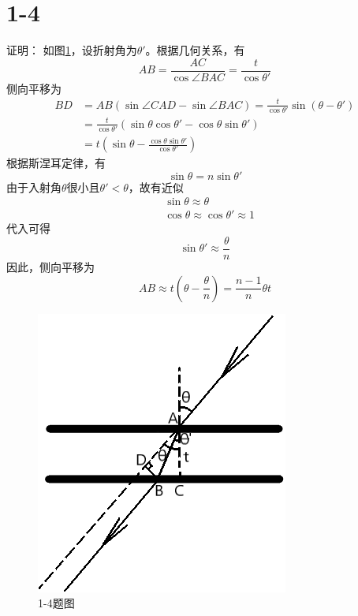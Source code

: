 \documentclass[10pt,a4paper]{article}
\theoremstyle{remark}
\begin{document}
\section*{1-4}证明：
如图\ref{FigureofProblem1-4}，设折射角为$\theta'$。根据几何关系，有
\[
AB = \frac{AC}{\cos\angle BAC} = \frac{t}{\cos\theta'}
\]
侧向平移为
\begin{align*}
BD &= AB(\sin\angle CAD - \sin\angle BAC) = \frac{t}{\cos\theta'}\sin(\theta - \theta')\\
&= \frac{t}{\cos\theta'}(\sin\theta\cos\theta' - \cos\theta\sin\theta')\\
&= t(\sin\theta - \frac{\cos\theta\sin\theta'}{\cos\theta'})
\end{align*}
根据斯涅耳定律，有
\[
\sin\theta = n\sin\theta'
\]
由于入射角$\theta$很小且$\theta' < \theta$，故有近似
\begin{align*}
&\sin\theta\approx\theta\\
&\cos\theta\approx\cos\theta'\approx1
\end{align*}
代入可得
\[
\sin\theta'\approx\frac{\theta}{n}
\]
因此，侧向平移为
\[
AB\approx t(\theta - \frac{\theta}{n}) = \frac{n - 1}{n}\theta t
\]
\begin{figure}[h]
\centering
\includegraphics[scale = .8]{FigureofProblem1-4.png}
\caption{1-4题图}\label{FigureofProblem1-4}
\end{figure}
\end{document}
